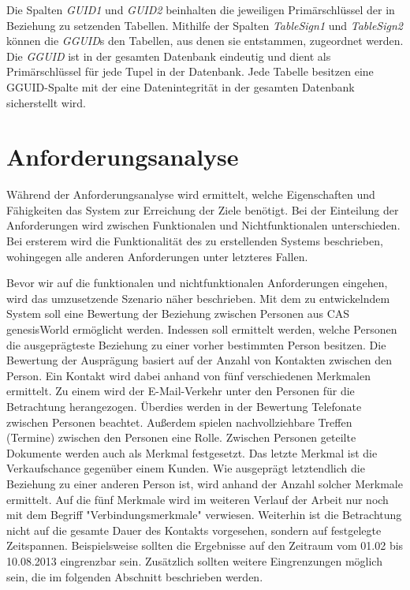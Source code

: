 Die Spalten \textit{GUID1} und \textit{GUID2} beinhalten die jeweiligen Primärschlüssel der in Beziehung zu setzenden Tabellen. Mithilfe der Spalten \textit{TableSign1} und \textit{TableSign2} können die \textit{GGUID}s den Tabellen, aus denen sie entstammen, zugeordnet werden. Die \textit{GGUID} ist in der gesamten Datenbank eindeutig und dient als Primärschlüssel für jede Tupel in der Datenbank. Jede Tabelle besitzen eine GGUID-Spalte mit der eine Datenintegrität in der gesamten Datenbank sicherstellt wird.

\section{Anforderungsanalyse}
\label{ch:Systemanalyse:sec:Anforderungsanalyse}

Während der Anforderungsanalyse wird ermittelt, welche Eigenschaften und Fähigkeiten das System zur Erreichung der Ziele benötigt. Bei der Einteilung der Anforderungen wird zwischen Funktionalen und Nichtfunktionalen unterschieden. Bei ersterem wird die Funktionalität des zu erstellenden Systems beschrieben, wohingegen alle anderen Anforderungen unter letzteres Fallen. 

Bevor wir auf die funktionalen und nichtfunktionalen Anforderungen eingehen, wird das umzusetzende Szenario näher beschrieben. Mit dem zu entwickelndem System soll eine Bewertung der Beziehung zwischen Personen aus CAS genesisWorld ermöglicht werden. Indessen soll ermittelt werden, welche Personen die ausgeprägteste Beziehung zu einer vorher bestimmten Person besitzen. Die Bewertung der Ausprägung basiert auf der Anzahl von Kontakten zwischen den Person. Ein Kontakt wird dabei anhand von fünf verschiedenen Merkmalen ermittelt. Zu einem wird der E-Mail-Verkehr unter den Personen für die Betrachtung herangezogen. Überdies werden in der Bewertung Telefonate zwischen Personen beachtet. Außerdem spielen nachvollziehbare Treffen (Termine) zwischen den Personen eine Rolle. Zwischen Personen geteilte Dokumente werden auch als Merkmal festgesetzt. Das letzte Merkmal ist die Verkaufschance gegenüber einem Kunden. Wie ausgeprägt letztendlich die Beziehung zu einer anderen Person ist, wird anhand der Anzahl solcher Merkmale ermittelt. Auf die fünf Merkmale wird im weiteren Verlauf der Arbeit nur noch mit dem Begriff "Verbindungsmerkmale" verwiesen. Weiterhin ist die Betrachtung nicht auf die gesamte Dauer des Kontakts vorgesehen, sondern auf festgelegte Zeitspannen. Beispielsweise sollten die Ergebnisse auf den Zeitraum vom 01.02 bis 10.08.2013 eingrenzbar sein. Zusätzlich sollten weitere Eingrenzungen möglich sein, die im folgenden Abschnitt beschrieben werden.

